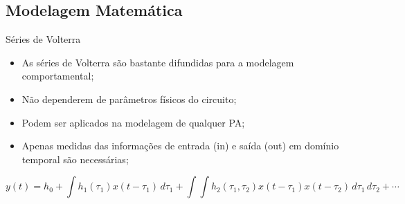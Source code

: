 \documentclass{if-beamer}
\begin{document}
\subsection{Modelagem Matemática}
\begin{frame}{Séries de Volterra}
		\begin{itemize}
			\item As séries de Volterra são bastante difundidas para a modelagem comportamental;
			\item Não dependerem de parâmetros físicos do circuito; 
			\item Podem ser aplicados na modelagem de qualquer PA;
			\item Apenas medidas das informações de entrada (in) e saída (out) em domínio temporal são necessárias;
		\end{itemize}
		\vspace{0.05\textwidth}
			\[
		y(t) = h_0 + \int h_1(\tau_1) x(t - \tau_1) \, d\tau_1 + \int \int h_2(\tau_1, \tau_2) x(t - \tau_1) x(t - \tau_2) \, d\tau_1 \, d\tau_2 + \cdots
		\]
\end{frame}
\end{document}
